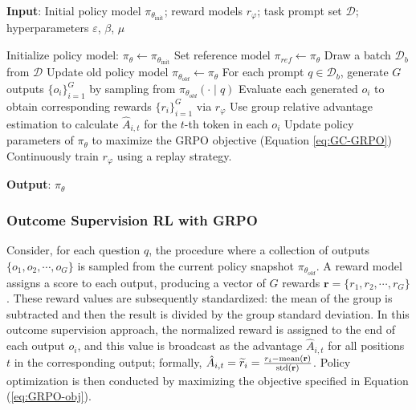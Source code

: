 \begin{algorithm}[t]
  \small
  \caption{Iterative Group Relative Policy Optimization}
  \textbf{Input}: Initial policy model $\pi_{\theta_{\text{init}}}$; reward models $r_\varphi$; task prompt set $\mathcal{D}$; 
  hyperparameters $\varepsilon$, $\beta$, $\mu$
  \begin{algorithmic}[1]
    \State Initialize policy model: $\pi_\theta \leftarrow \pi_{\theta_{\text{init}}}$
       \State Set reference model $\pi_{ref} \leftarrow \pi_{\theta}$
      \State Draw a batch $\mathcal{D}_b$ from $\mathcal{D}$
      \State Update old policy model $\pi_{\theta_{old}} \leftarrow \pi_{\theta}$
      \State For each prompt $q \in \mathcal{D}_b$, generate $G$ outputs $\{o_i\}_{i=1}^G$ by sampling from $\pi_{\theta_{old}}(\cdot \mid q)$
      \State Evaluate each generated $o_i$ to obtain corresponding rewards $\{r_i\}_{i=1}^G$ via $r_{\varphi}$
      \State Use group relative advantage estimation to calculate $\hat{A}_{i,t}$ for the $t$-th token in each $o_i$
        \State Update policy parameters of $\pi_{\theta}$ to maximize the GRPO objective (Equation \ref{eq:GC-GRPO})
      \EndFor
    \EndFor
    \State Continuously train $r_\varphi$ using a replay strategy.
    \EndFor
  \end{algorithmic}
  \textbf{Output}: $\pi_\theta$
  \label{alg:iter-grpo}
\end{algorithm}

\subsubsection{Outcome Supervision RL with GRPO} Consider, for each question $q$, the procedure where a collection of outputs $\{o_1, o_2, \cdots, o_G\}$ is sampled from the current policy snapshot $\pi_{\theta_{old}}$. A reward model assigns a score to each output, producing a vector of $G$ rewards $\mathbf{r} = \{r_1, r_2, \cdots, r_G\}$. These reward values are subsequently standardized: the mean of the group is subtracted and then the result is divided by the group standard deviation. In this outcome supervision approach, the normalized reward is assigned to the end of each output $o_i$, and this value is broadcast as the advantage $\hat{A}_{i, t}$ for all positions $t$ in the corresponding output; formally, $\hat{A}_{i, t} = \widetilde{r}_i = \frac{r_i- {\rm mean}(\mathbf{r})}{{\rm std}(\mathbf{r})}$. Policy optimization is then conducted by maximizing the objective specified in Equation (\ref{eq:GRPO-obj}).

